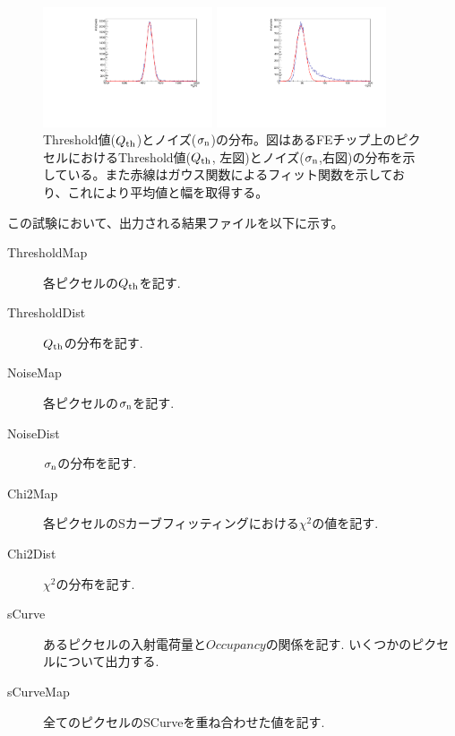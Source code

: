 \begin{figure}[bpt]\centering
  \begin{minipage}{0.45\hsize}
    \includegraphics[width=50mm,angle=270]{Threshold_mean_dist}
  \end{minipage}
  \begin{minipage}{0.45\hsize}
    \includegraphics[width=50mm,angle=270]{Threshold_noise_dist}
  \end{minipage}
  \caption[Threshold値($Q_{\rm th}$)とノイズ($\sigma_{\rm n}$)の分布。]{Threshold値($Q_{\rm th}$)とノイズ($\sigma_{\rm n}$)の分布。図はあるFEチップ上のピクセルにおけるThreshold値($Q_{\rm th}$, 左図)とノイズ($\sigma_{\rm n}$,右図)の分布を示している。また赤線はガウス関数によるフィット関数を示しており、これにより平均値と幅を取得する。}
  \label{threshold_mean_sigma}
\end{figure}

この試験において、出力される結果ファイルを以下に示す。
\begin{description}
  \item [ThresholdMap] 各ピクセルの$Q_{\rm th}$を記す.
  \item [ThresholdDist] $Q_{\rm th}$の分布を記す.
  \item [NoiseMap] 各ピクセルの$\sigma_{\rm n}$を記す.
  \item [NoiseDist] $\sigma_{\rm n}$の分布を記す. 
  \item [Chi2Map] 各ピクセルのSカーブフィッティングにおける$\chi^2$の値を記す.
  \item [Chi2Dist] $\chi^2$の分布を記す.
  \item [sCurve] あるピクセルの入射電荷量と$Occupancy$の関係を記す. いくつかのピクセルについて出力する.
  \item [sCurveMap] 全てのピクセルのSCurveを重ね合わせた値を記す.
\end{description}

